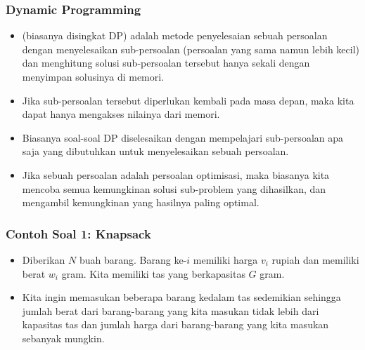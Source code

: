 \begin{frame} 
\frametitle{Dynamic Programming}
\begin{itemize}
  \item {} (biasanya disingkat DP) adalah metode penyelesaian sebuah persoalan dengan menyelesaikan sub-persoalan (persoalan yang sama namun lebih kecil) dan menghitung solusi sub-persoalan tersebut hanya sekali dengan menyimpan solusinya di memori.
  \item Jika sub-persoalan tersebut diperlukan kembali pada masa depan, maka kita dapat hanya mengakses nilainya dari memori.
  \item Biasanya soal-soal DP diselesaikan dengan mempelajari sub-persoalan apa saja yang dibutuhkan untuk menyelesaikan sebuah persoalan.
  \item Jika sebuah persoalan adalah persoalan optimisasi, maka biasanya kita mencoba semua kemungkinan solusi sub-problem yang dihasilkan, dan  mengambil kemungkinan yang hasilnya paling optimal. 
\end{itemize}
\end{frame}

\begin{frame} 
\frametitle{Contoh Soal 1: Knapsack}
\begin{itemize}
  \item Diberikan $N$ buah barang. Barang ke-$i$ memiliki harga $v_i$ rupiah dan memiliki berat $w_i$ gram. Kita memiliki tas yang berkapasitas $G$ gram. 
  \item Kita ingin memasukan beberapa barang kedalam tas sedemikian sehingga jumlah berat dari barang-barang yang kita masukan tidak lebih dari kapasitas tas dan jumlah harga dari barang-barang yang kita masukan sebanyak mungkin.
\end{itemize}
\end{frame}

